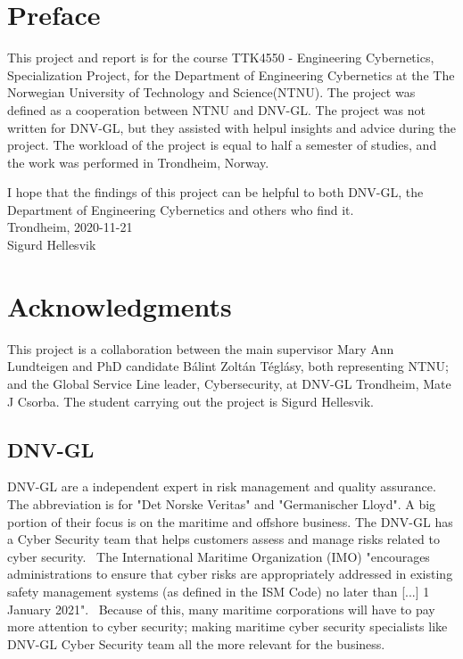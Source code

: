 \section*{Preface}
This project and report is for the course TTK4550 - Engineering Cybernetics, Specialization Project, for the Department of Engineering Cybernetics at the The Norwegian University of Technology and Science(NTNU). The project was defined as a cooperation between NTNU and DNV-GL. The project was not written for DNV-GL, but they assisted with helpul insights and advice during the project. The workload of the project is equal to half a semester of studies, and the work was performed in Trondheim, Norway.

I hope that the findings of this project can be helpful to both DNV-GL, the Department of Engineering Cybernetics and others who find it. 
\\
Trondheim, 2020-11-21
\\
Sigurd Hellesvik
\newpage

\section*{Acknowledgments} \label{sec:ack}
This project is a collaboration between the main supervisor Mary Ann Lundteigen and PhD candidate Bálint Zoltán Téglásy, both representing NTNU; and the Global Service Line leader, Cybersecurity, at DNV-GL Trondheim,  Mate J Csorba. The student carrying out the project is Sigurd Hellesvik.

\subsection*{DNV-GL}\label{sec:dnvgl}
DNV-GL are a independent expert in risk management and quality assurance. The abbreviation is for "Det Norske Veritas" and "Germanischer Lloyd". A big portion of their focus is on the maritime and offshore business. The DNV-GL has a Cyber Security team that helps customers assess and manage risks related to cyber security.~\cite{DNVGL_cybersec}  The International Maritime Organization (IMO) "encourages administrations to ensure that cyber risks are appropriately addressed in existing safety management systems (as defined in the ISM Code) no later than [...] 1 January 2021".~\cite{IMO_2021} Because of this, many maritime corporations will have to pay more attention to cyber security; making maritime cyber security specialists like DNV-GL Cyber Security team all the more relevant for the business. 

